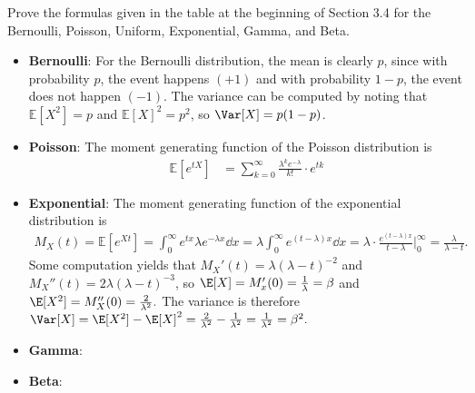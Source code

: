 \documentclass[a4paper]{article}
\begin{document}
\begin{Exercise}
	Prove the formulas given in the table at the beginning of Section 3.4 for the Bernoulli, Poisson, Uniform, Exponential, Gamma, and Beta.
\end{Exercise}
\begin{Solution}
\begin{itemize}
	\item \textbf{Bernoulli}: For the Bernoulli distribution, the mean is clearly $p$, since with probability $p$, the event happens $(+1)$ and with probability $1 - p$, the event does not happen $(-1)$. The variance can be computed by noting that $\mathbb{E}[X^2] = p$ and $\mathbb{E}[X]^2 = p^2$, so $\Var[X] = p (1 - p)$.
	\item \textbf{Poisson}: The moment generating function of the Poisson distribution is
	\begin{align*}
		\mathbb{E}[e^{tX}] &= \sum_{k = 0}^{\infty} \frac{\lambda^k e^{-\lambda}}{k!} \cdot e^{tk}
		
	\end{align*}
	\item \textbf{Exponential}: The moment generating function of the exponential distribution is 
	\begin{align*}
		M_X(t) = \mathbb{E}[e^{Xt}] = \int_0^{\infty} e^{tx} \lambda e^{-\lambda x} \dd x = \lambda \int_0^{\infty} e^{(t - \lambda) x} \dd x = \lambda \cdot \frac{e^{(t - \lambda)x}}{t - \lambda} \Big|_0^{\infty} = \frac{\lambda}{\lambda - t}.
	\end{align*}
	Some computation yields that $M_X'(t) = \lambda (\lambda - t)^{-2}$ and $M_X''(t)= 2\lambda (\lambda - t)^{-3}$, so $\E[X] = M_x'(0) = \frac{1}{\lambda} = \beta$ and $\E[X^2] = M_X''(0) = \frac{2}{\lambda^2}.$ The variance is therefore $\Var[X] = \E[X^2]- \E[X]^2 = \frac{2}{\lambda^2} - \frac{1}{\lambda^2}= \frac{1}{\lambda^2} = \beta^2.$
	\item \textbf{Gamma}:
	\item \textbf{Beta}: 
\end{itemize}
\end{Solution}
\end{document}
